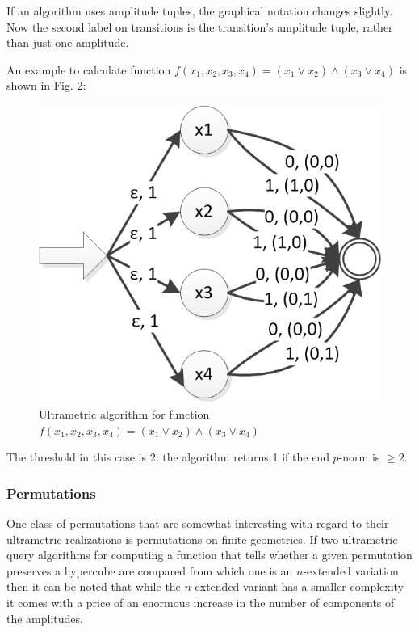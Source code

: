 \documentclass{llncs}
\begin{document}
If an algorithm uses amplitude tuples, the graphical notation changes slightly. Now the second label on transitions is the transition's amplitude tuple, rather than just one amplitude.

An example to calculate function $f(x_1,x_2,x_3,x_4)=(x_1\vee x_2)\wedge (x_3\vee x_4)$ is shown in Fig. 2:

\begin{figure}
	\centering
	\includegraphics{or_and_or.png}
	\caption{Ultrametric algorithm for function $f(x_1,x_2,x_3,x_4 )=(x_1\vee x_2 )\wedge (x_3\vee x_4 )$}
	  \label{or_and_or}
\end{figure}

The threshold in this case is 2: the algorithm returns 1 if the end $p$-norm is $\geq2$.

\subsubsection{Permutations}
One class of permutations that are somewhat interesting with regard to their ultrametric realizations is permutations on finite geometries. If two ultrametric query algorithms for computing a function that tells whether a given permutation preserves a hypercube are compared from which one is an $n$-extended variation then it can be noted that while the $n$-extended variant has a smaller complexity it comes with a price of an enormous increase in the number of components of the amplitudes.
\end{document}
